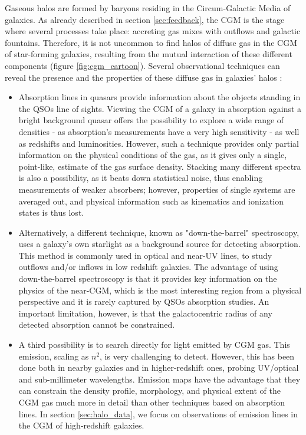 Gaseous halos are formed by baryons residing in the Circum-Galactic Media of galaxies. As already described in section \ref{sec:feedback}, the CGM is the stage where several processes take place: accreting gas mixes with outflows and galactic fountains. Therefore, it is not uncommon to find halos of diffuse gas in the CGM of star-forming galaxies, resulting from the mutual interaction of these different components (figure \ref{fig:cgm_cartoon}). Several observational techniques can reveal the presence and the properties of these diffuse gas in galaxies' halos \citep[for details, see][]{tumlison}:
\begin{itemize}
    \item Absorption lines in quasars provide information about the objects standing in the QSOs line of sights. Viewing the CGM of a galaxy in absorption against a bright background quasar offers the possibility to explore a wide range of densities - as absorption's measurements have a very high sensitivity - as well as redshifts and luminosities. However, such a technique provides only partial information on the physical conditions of the gas, as it gives only a single, point-like, estimate of the gas surface density. Stacking many different spectra is also a possibility, as it beats down statistical noise, thus enabling measurements of weaker absorbers; however, properties of single systems are averaged out, and physical information such as kinematics and ionization states is thus lost.
    \item Alternatively, a different technique, known as "down-the-barrel" spectroscopy, uses a galaxy’s own starlight as a background source for detecting absorption. This method is commonly used in optical and near-UV lines, to study outflows and/or inflows in low redshift galaxies. The advantage of using down-the-barrel spectroscopy is that it provides key information on the physics of the near-CGM, which is the most interesting region from a physical perspective and it is rarely captured by QSOs absorption studies. An important limitation, however, is that the galactocentric radius of any detected absorption cannot be constrained.
    \item A third possibility is to search directly for light emitted by CGM gas. This emission, scaling as $n^2$, is very challenging to detect. However, this has been done both in nearby galaxies and in higher-redshift ones, probing UV/optical and sub-millimeter wavelengths. Emission maps have the advantage that they can constrain the density profile, morphology, and physical extent of the CGM gas much more in detail than other techniques based on absorption lines. In section \ref{sec:halo_data}, we focus on observations of emission lines in the CGM of high-redshift galaxies.
\end{itemize}
